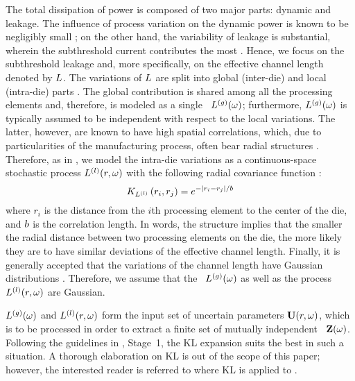 The total dissipation of power is composed of two major parts: dynamic and leakage. The influence of process variation on the dynamic power is known to be negligibly small \cite{juan2011, juan2012, srivastava2010}; on the other hand, the variability of leakage is substantial, wherein the subthreshold current contributes the most \cite{juan2011, juan2012}. Hence, we focus on the subthreshold leakage and, more specifically, on the effective channel length denoted by $L$. The variations of $L$ are split into global (inter-die) and local (intra-die) parts \cite{chandra2010, juan2011, juan2012, srivastava2010, shen2009}. The global contribution is shared among all the processing elements and, therefore, is modeled as a single \rv\ ${L^{(g)}}(\omega)$; furthermore, ${L^{(g)}}(\omega)$ is typically assumed to be independent with respect to the local variations. The latter, however, are known to have high spatial correlations, which, due to particularities of the manufacturing process, often bear radial structures \cite{friedberg2005, cheng2011}. Therefore, as in \cite{ghanta2006}, we model the intra-die variations as a continuous-space stochastic process $L^{(l)}(r, \omega)$ with the following radial covariance function \cite{ghanem1991}:
\begin{equation} \elabel{covariance-function}
  \fCov{\lLeff}{r_i, r_j} = e^{-|r_i - r_j|/\corrLength}
\end{equation}
where $r_i$ is the distance from the $i$th processing element to the center of the die, and $b$ is the correlation length. In words, the structure implies that the smaller the radial distance between two processing elements on the die, the more likely they are to have similar deviations of the effective channel length. Finally, it is generally accepted that the variations of the channel length have Gaussian distributions \cite{juan2011, juan2012, srivastava2010}. Therefore, we assume that the \rv\ ${L^{(g)}}(\omega)$ as well as the process $L^{(l)}(r, \omega)$ are Gaussian.

${L^{(g)}}(\omega)$ and $L^{(l)}(r, \omega)$ form the input set of uncertain parameters $\mathbf{U}(r, \omega)$, which is to be processed in order to extract a finite set of mutually independent \rvs\ $\mathbf{Z}(\omega)$. Following the guidelines in , Stage~1, the KL expansion suits the best in such a situation. A thorough elaboration on KL is out of the scope of this paper; however, the interested reader is referred to  where KL is applied to .
